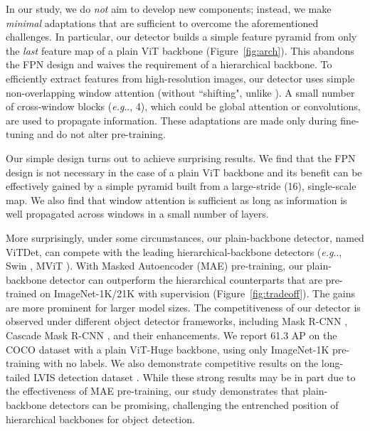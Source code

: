 \documentclass[runningheads]{llncs}
\makeatletter
\DeclareRobustCommand\onedot{\futurelet\@let@token\@onedot}
\def\@onedot{\ifx\@let@token.\else.\null\fi\xspace}
\def\eg{\emph{e.g}\onedot} \def\Eg{\emph{E.g}\onedot}
\newcommand{\boxAP}{AP\xspace}
\makeatother
\begin{document}

In our study, we do \textit{not} aim to develop new components; instead, we make \textit{minimal} adaptations that are sufficient to overcome the aforementioned challenges. In particular, our detector builds a simple feature pyramid from only the \textit{last} feature map of a plain ViT backbone (Figure~\ref{fig:arch}). This abandons the FPN design \cite{Lin2017} and waives the requirement of a hierarchical backbone. To efficiently extract features from high-resolution images, our detector uses simple non-overlapping window attention (without ``shifting", unlike \cite{Liu2021}). A small number of cross-window blocks (\eg, 4), which could be global attention \cite{Vaswani2017} or convolutions, are used to propagate information. These adaptations are made only during fine-tuning and do not alter pre-training.

Our simple design turns out to achieve surprising results. We find that the FPN design is not necessary in the case of a plain ViT backbone and its benefit can be effectively gained by a simple pyramid built from a large-stride (16), single-scale  map. We also find that window attention is sufficient as long as information is well propagated across windows in a small number of layers.

More surprisingly, under some circumstances, our plain-backbone detector, named {ViTDet}, can compete with the leading hierarchical-backbone detectors (\eg, Swin \cite{Liu2021}, MViT \cite{Fan2021,Li2021a}).
With Masked Autoencoder (MAE) \cite{He2021} pre-training, our plain-backbone detector can outperform the hierarchical counterparts that are pre-trained on ImageNet-1K/21K \cite{Deng2009} with supervision (Figure~\ref{fig:tradeoff}).
The gains are more prominent for larger model sizes. 
The competitiveness of our detector is observed under different object detector frameworks, including Mask R-CNN \cite{He2017}, Cascade Mask R-CNN \cite{Cai2019}, and their enhancements.
We report 61.3 \boxAP on the COCO dataset \cite{Lin2014} with a plain ViT-Huge backbone, using only ImageNet-1K pre-training with no labels. We also demonstrate competitive results on the long-tailed LVIS detection dataset \cite{Gupta2019}.
While these strong results may be in part due to the effectiveness of MAE pre-training, our study demonstrates that plain-backbone detectors can be promising, challenging the entrenched position of hierarchical backbones for object detection.
\end{document}

